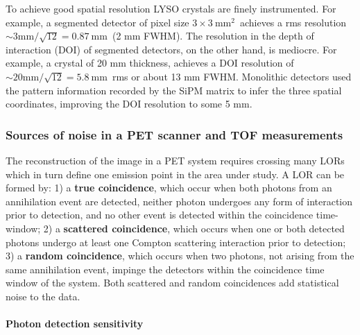 To achieve good spatial resolution LYSO crystals are finely instrumented. For example, a segmented detector of pixel size $3 \times 3 ~\mathrm{mm^2}$~achieves a rms resolution $\sim \mathrm{3 mm/\sqrt{12} = 0.87~ mm}$~(2 mm FWHM). The resolution in the depth of interaction (DOI) of segmented detectors, on the other hand, is mediocre. For example, a crystal of 20 mm thickness, achieves a DOI resolution of  
$\sim \mathrm{20 mm/\sqrt{12} = 5.8~ mm}$~rms or about 13 mm FWHM. Monolithic detectors used the pattern information recorded by the SiPM matrix to infer the three spatial coordinates, improving the DOI resolution to some 5 mm. 

\subsubsection*{Sources of noise in a PET scanner and TOF measurements}

The reconstruction of the image in a PET system requires crossing many LORs which in turn define one emission point in the area under study. A LOR can be formed by: 1) a {\bf true coincidence}, which occur when both photons from an annihilation event are detected, neither photon undergoes any form of interaction prior to detection, and no other event is detected within the coincidence time-window; 2)
a {\bf scattered coincidence}, which occurs when one or both detected photons undergo at least one Compton scattering interaction prior to detection;
3)  a {\bf random coincidence}, which occurs when two photons, not arising from the same annihilation event, impinge the detectors within the coincidence time window of the system. Both scattered and random coincidences  add statistical noise to the data. 

\paragraph{Photon detection sensitivity}

